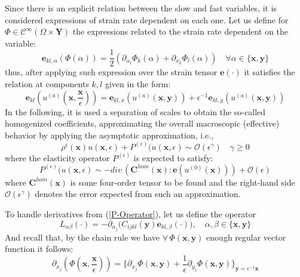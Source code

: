 Since there is an explicit relation between the slow and fast variables, it is considered expressions of strain rate dependent on each one. Let us define for $\Phi \in \mathcal{C}^{\infty}(\Omega \times \mathbf{Y})$ the expressions related to the strain rate dependent on the variable:
\begin{equation*}
    \mathbf{e}_{kl,\alpha} (\Phi(\alpha)) = \frac{1}{2}(\partial_{\alpha_l} \Phi_k (\alpha) + \partial_{x_k} \Phi_l (\alpha)) \quad \forall \alpha \in \{\mathbf{x}, \mathbf{y}\}
\end{equation*}
thus, after applying such expression over the strain tensor $\mathbf{e}(\cdot)$ it satisfies the relation at components $k,l$ given in the form:
\begin{equation}
    \label{Multiscale-Strain}
    \mathbf{e}_{kl} ( u^{(a)}(\mathbf{x}, \frac{\mathbf{x}}{\epsilon})) = \mathbf{e}_{kl,x}( u^{(a)} (\mathbf{x},\mathbf{y})) + \epsilon^{-1} \mathbf{e}_{kl,y} (u^{(a)}(\mathbf{x},\mathbf{y}))
\end{equation}
In the following, it is used a separation of scales to obtain the so-called homogenized coefficients, approximating the overall macroscopic (effective) behavior by applying the asymptotic approximation, i.e.,
\begin{equation*}
    \rho^{\epsilon}(\mathbf{x}) u(\mathbf{x}, \epsilon) + P^{(\epsilon)}(u(\mathbf{x},\epsilon) \sim \mathcal{O}(\epsilon^{\gamma}) \quad \gamma \geq 0
\end{equation*}
where the elasticity operator $P^{(\epsilon)}$ is expected to satisfy:
\begin{equation}
    \label{P-Operator}
    P^{(\epsilon)}(u(\mathbf{x},\epsilon) \sim - div \, (\mathbf{C}^{hom}(\mathbf{x}): \mathbf{e}(u^{(0)}(\mathbf{x}))) + \mathcal{O}(\epsilon)
\end{equation}
where $\mathbf{C}^{hom}(\mathbf{x})$ is some four-order tensor to be found and the right-hand side $\mathcal{O}(\epsilon^{\gamma})$ denotes the error expected from such an approximation. 

To handle derivatives from (\ref{P-Operator}), let us define the operator 
\begin{equation*}
    L_{\alpha \beta} (\cdot) = - \partial_{\alpha_j} \big( C_{ijkl} (\mathbf{y}) \mathbf{e}_{kl, \beta}(\cdot) \big), \quad \alpha, \beta \in \{ \mathbf{x},\mathbf{y} \}
\end{equation*}
And recall that, by the chain rule we have $\forall \, \Phi(\mathbf{x},\mathbf{y})$ enough regular vector function it follows:
\begin{equation*}
    \partial_{x_j} (\Phi (\mathbf{x}, \frac{\mathbf{x}}{\epsilon})) = \big \{ \partial_{x_j} \Phi (\mathbf{x}, \mathbf{y}) + \frac{1}{\epsilon} \partial_{y_j} \Phi(\mathbf{x},\mathbf{y}) \big \}_{\mathbf{y}= \epsilon^{-1}\mathbf{x}}
\end{equation*}


